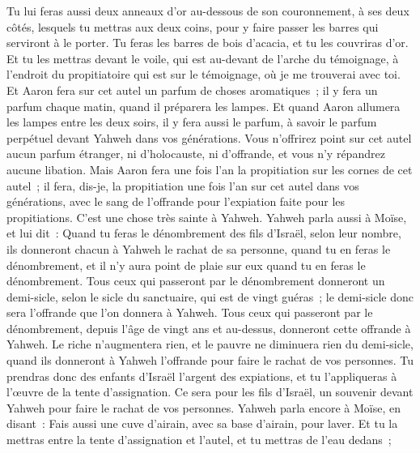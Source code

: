 \begin{multicols}{2}
Tu lui feras aussi deux anneaux d'or au-dessous de son couronnement, à ses deux côtés, lesquels tu mettras aux deux coins, pour y faire passer les barres qui serviront à le porter.
Tu feras les barres de bois d'acacia, et tu les couvriras d'or.
Et tu les mettras devant le voile, qui est au-devant de l'arche du témoignage, à l'endroit du propitiatoire qui est sur le témoignage, où je me trouverai avec toi.
Et Aaron fera sur cet autel un parfum de choses aromatiques~; il y fera un parfum chaque matin, quand il préparera les lampes.
Et quand Aaron allumera les lampes entre les deux soirs, il y fera aussi le parfum, à savoir le parfum perpétuel devant Yahweh dans vos générations.
Vous n'offrirez point sur cet autel aucun parfum étranger, ni d'holocauste, ni d'offrande, et vous n'y répandrez aucune libation.
Mais Aaron fera une fois l'an la propitiation sur les cornes de cet autel~; il fera, dis-je, la propitiation une fois l'an sur cet autel dans vos générations, avec le sang de l'offrande pour l'expiation faite pour les propitiations. C'est une chose très sainte à Yahweh.
Yahweh parla aussi à Moïse, et lui dit~:
Quand tu feras le dénombrement des fils d'Israël, selon leur nombre, ils donneront chacun à Yahweh le rachat de sa personne, quand tu en feras le dénombrement, et il n'y aura point de plaie sur eux quand tu en feras le dénombrement.
Tous ceux qui passeront par le dénombrement donneront un demi-sicle, selon le sicle du sanctuaire, qui est de vingt guéras~; le demi-sicle donc sera l'offrande que l'on donnera à Yahweh.
Tous ceux qui passeront par le dénombrement, depuis l'âge de vingt ans et au-dessus, donneront cette offrande à Yahweh.
Le riche n'augmentera rien, et le pauvre ne diminuera rien du demi-sicle, quand ils donneront à Yahweh l'offrande pour faire le rachat de vos personnes.
Tu prendras donc des enfants d'Israël l'argent des expiations, et tu l'appliqueras à l'œuvre de la tente d'assignation. Ce sera pour les fils d'Israël, un souvenir devant Yahweh pour faire le rachat de vos personnes.
Yahweh parla encore à Moïse, en disant~:
Fais aussi une cuve d'airain, avec sa base d'airain, pour laver. Et tu la mettras entre la tente d'assignation et l'autel, et tu mettras de l'eau dedans~;

\end{multicols}
